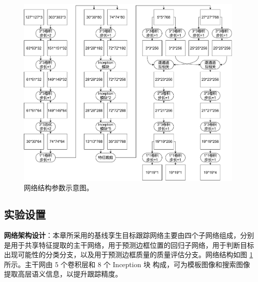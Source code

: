 \begin{figure}[t!]
    \centering
    \includegraphics[width=0.99\textwidth]{Img/MTP/SiamFC++.pdf}
    \caption{网络结构参数示意图。}
    \label{fig:MTP_SiamFC++}
\end{figure}

\subsection{实验设置}
\textbf{网络架构设计}：本章所采用的基线孪生目标跟踪网络主要由四个子网络组成，分别是用于共享特征提取的主干网络，用于预测边框位置的回归子网络，用于判断目标出现可能性的分类分支，以及用于预测边框质量的质量评估分支。网络结构如图 \ref{fig:MTP_SiamFC++} 所示。主干网由 5 个卷积层和 8 个 Inception 块 \cite{GoogLeNet} 构成，可为模板图像和搜索图像提取高层语义信息，以提升跟踪精度。


